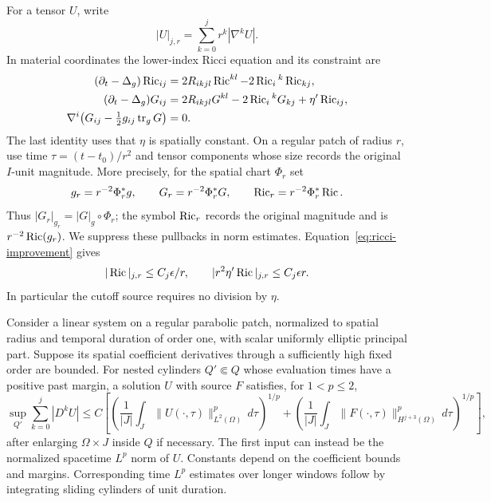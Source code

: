 For a tensor $U$, write
\[
 |U|_{j,r}=\sum_{k=0}^j r^k|\nabla^kU|.
\]
In material coordinates the lower-index Ricci equation and its constraint
are
\begin{align}
 (\partial_t-\Delta_g)\operatorname{Ric}_{ij}
   &=2R_{ikjl}\operatorname{Ric}^{kl}-2\operatorname{Ric}_i{}^k\operatorname{Ric}_{kj},
   \label{para:ricci-equation}\\
 (\partial_t-\Delta_g)G_{ij}
   &=2R_{ikjl}G^{kl}-2\operatorname{Ric}_i{}^kG_{kj}+\eta'\operatorname{Ric}_{ij},
   \label{para:cutoff-equation}\\
 \nabla^i\bigl(G_{ij}-\tfrac12 g_{ij}\operatorname{tr}_gG\bigr)&=0.
   \label{para:bianchi}
\end{align}
The last identity uses that $\eta$ is spatially constant.  On a regular
patch of radius $r$, use time $\tau=(t-t_0)/r^2$ and tensor components whose
size records the original $I$-unit magnitude.  More precisely, for the
spatial chart $\Phi_r$ set
\[
 g_r=r^{-2}\Phi_r^*g,\qquad G_r=r^{-2}\Phi_r^*G,\qquad
 \operatorname{Ric}_r=r^{-2}\Phi_r^*\operatorname{Ric}.
\]
Thus $|G_r|_{g_r}=|G|_g\circ\Phi_r$; the symbol $\operatorname{Ric}_r$ records
the original magnitude and is $r^{-2}\operatorname{Ric}(g_r)$.
We suppress these pullbacks in norm estimates.
Equation~\eqref{eq:ricci-improvement}
gives
\begin{equation}
 |\operatorname{Ric}|_{j,r}\le C_j\epsilon/r,
 \qquad |r^2\eta'\operatorname{Ric}|_{j,r}\le C_j\epsilon r.
 \label{para:source-scale}
\end{equation}
In particular the cutoff source requires no division by $\eta$.

\begin{lemma}
\label{para:local-smoothing}
Consider a linear system on a regular parabolic patch, normalized to spatial
radius and temporal duration of order one, with scalar uniformly elliptic
principal part.  Suppose its spatial coefficient derivatives through a
sufficiently high fixed order are bounded.  For nested cylinders
$Q'\Subset Q$ whose evaluation times have a positive past margin, a
solution $U$ with source $F$ satisfies, for $1<p\le2$,
\begin{equation}
 \sup_{Q'}\sum_{k=0}^j|D^kU|
 \le C\left[
 \left(\frac1{|J|}\int_J\|U(\cdot,\tau)\|_{L^2(\Omega)}^p\,d\tau\right)^{1/p}
 +\left(\frac1{|J|}\int_J\|F(\cdot,\tau)\|_{H^{j+3}(\Omega)}^p\,d\tau\right)^{1/p}
 \right],
 \label{para:local-mixed}
\end{equation}
after enlarging $\Omega\times J$ inside $Q$ if necessary.  The first input
can instead be the normalized spacetime $L^p$ norm of $U$.  Constants
depend on the coefficient bounds and margins.  Corresponding time
$L^p$ estimates over longer windows follow by integrating sliding
cylinders of unit duration.
\end{lemma}

